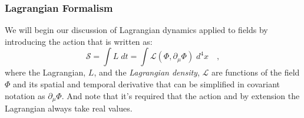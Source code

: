 \documentclass[12pt]{article}
\begin{document}
\subsubsection{Lagrangian Formalism}
We will begin our discussion of Lagrangian dynamics applied to fields by introducing the action that is written as: 
%
\begin{equation}
\mathcal{S}=\int L \; dt=\int \mathcal{L}(\Phi , \partial_\mu \Phi) \; d^4 x \quad , 
\end{equation}
%
where the Lagrangian, $L$, and the \textit{Lagrangian density}, $\mathcal{L}$ are functions of the field $\Phi $ and its spatial and temporal derivative that can be simplified in covariant notation as $\partial_\mu \Phi$. And note that it's required that the action and by extension the Lagrangian always take real values. 
\end{document}
